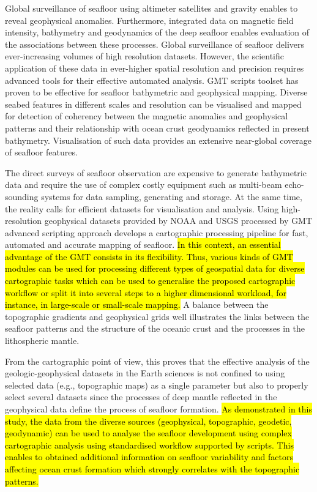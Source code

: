 \documentclass[geomatics,article,submit,pdftex,moreauthors]{Definitions/mdpi}
\begin{document}
Global surveillance of seafloor using altimeter satellites and gravity enables to reveal geophysical anomalies. Furthermore, integrated data on magnetic field intensity, bathymetry and geodynamics of the deep seafloor enables evaluation of the associations between these processes. Global surveillance of seafloor delivers ever-increasing volumes of high resolution datasets. However, the scientific application of these data in ever-higher spatial resolution and precision requires advanced tools  for their effective automated analysis. GMT scripts toolset has proven to be effective for seafloor bathymetric and geophysical mapping. Diverse seabed features in different scales and resolution can be visualised and mapped for detection of coherency between the magnetic anomalies and geophysical patterns and their relationship with ocean crust geodynamics reflected in present bathymetry. Visualisation of such data provides an extensive near-global coverage of seafloor features. 

The direct surveys of seafloor observation are expensive to generate bathymetric data and require the use of complex costly equipment such as multi-beam echo-sounding systems for data sampling, generating and storage. At the same time, the reality calls for efficient datasets for visualisation and analysis. Using high-resolution geophysical datasets provided by NOAA and USGS processed by GMT advanced scripting approach develops a cartographic processing pipeline for fast, automated and accurate mapping of seafloor. \hl{In this context, an essential advantage of the GMT consists in its flexibility. Thus, various kinds of GMT modules can be used for processing different types of geospatial data for diverse cartographic tasks which can be used to generalise the proposed cartographic workflow or split it into several steps to a higher dimensional workload, for instance, in large-scale or small-scale mapping. }A balance between the topographic gradients and geophysical grids well illustrates the links between the seafloor patterns and the structure of the oceanic crust and the processes in the lithospheric mantle. 

From the cartographic point of view, this proves that the effective analysis of the geologic-geophysical datasets in the Earth sciences is not confined to using selected data (e.g., topographic maps) as a single parameter but also to properly select several datasets since the processes of deep mantle reflected in the geophysical data define the process of seafloor formation. \hl{As demonstrated in this study, the data from the diverse sources (geophysical, topographic, geodetic, geodynamic) can be used to analyse the seafloor development using complex cartographic analysis using standardised workflow supported by scripts. This enables to obtained additional information on seafloor variability and factors affecting ocean crust formation which strongly correlates with the topographic patterns.} 
\end{document}
